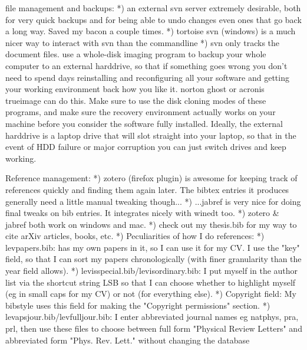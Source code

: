 file management and backups:
*) an external svn server extremely desirable, both for very quick backups and for being able to undo changes even ones that go back a long way. Saved my bacon a couple times.
*) tortoise svn (windows) is a much nicer way to interact with svn than the commandline
*) svn only tracks the document files. use a whole-disk imaging program to backup your whole computer to an external harddrive, so that if something goes wrong you don't need to spend days reinstalling and reconfiguring all your software and getting your working environment back how you like it. norton ghost or acronis trueimage can do this. Make sure to use the disk cloning modes of these programs, and make sure the recovery environment actually works on your machine before you consider the software fully installed. Ideally, the external harddrive is a laptop drive that will slot straight into your laptop, so that in the event of HDD failure or major corruption you can just switch drives and keep working.

Reference management:
*) zotero (firefox plugin) is awesome for keeping track of references quickly and finding them again later. The bibtex entries it produces generally need a little manual tweaking though...
*) ...jabref is very nice for doing final tweaks on bib entries. It integrates nicely with winedt too.
*) zotero & jabref both work on windows and mac.
*) check out my thesis.bib for my way to cite arXiv articles, books, etc.
*) Peculiarities of how I do references:
    *) levpapers.bib: has my own papers in it, so I can use it for my CV. I use the "key" field, so that I can sort my papers chronologically (with finer granularity than the year field allows).
    *) levisspecial.bib/levisordinary.bib: I put myself in the author list via the shortcut string LSB so that I can choose whether to highlight myself (eg in small caps for my CV) or not (for everything else).
    *) Copyright field: My bibstyle uses this field for making the "Copyright permissions" section.
    *) levapsjour.bib/levfulljour.bib: I enter abbreviated journal names eg natphys, pra, prl, then use these files to choose between full form "Physical Review Letters" and abbreviated form "Phys. Rev. Lett." without changing the database

